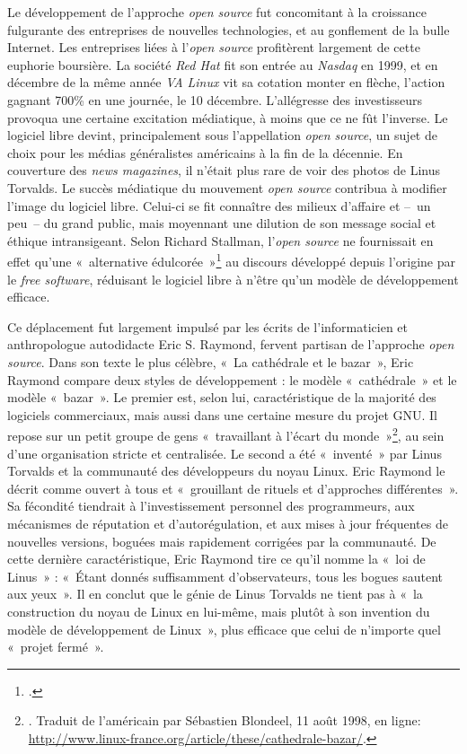 \documentclass{FramateX}
\begin{document}
\begin{refsection}
Le développement de l'approche \textit{open source} fut concomitant à la
croissance fulgurante des entreprises de nouvelles technologies, et au
gonflement de la bulle Internet. Les entreprises liées à l'\textit{open
source} profitèrent largement de cette euphorie boursière. La société
\textit{Red Hat} fit son entrée au \textit{Nasdaq} en 1999, et en
décembre de la même année \textit{VA Linux} vit sa cotation monter en
flèche, l'action gagnant 700\% en une journée, le 10 décembre.
L'allégresse des investisseurs provoqua une certaine excitation
médiatique, à moins que ce ne fût l'inverse. Le logiciel libre devint,
principalement sous l'appellation \textit{open source}, un sujet de
choix pour les médias généralistes américains à la fin de la décennie.
En couverture des \textit{news magazines}, il n'était plus rare de voir
des photos de Linus Torvalds. Le succès médiatique du mouvement
\textit{open source} contribua à modifier l'image du logiciel libre.
Celui-ci se fit connaître des milieux d'affaire et –~un peu~– du grand
public, mais moyennant une dilution de son message social et éthique
intransigeant. Selon Richard Stallman, l'\textit{open source} ne
fournissait en effet qu'une «~alternative
édulcorée~»\footnote{\cite{stallmanthus2000}.} au
discours développé depuis l'origine par le \textit{free software}, réduisant le logiciel libre à n'être
qu'un modèle de développement efficace.

Ce déplacement fut largement impulsé par les écrits de l'informaticien
et anthropologue autodidacte Eric S. Raymond, fervent partisan de
l'approche \textit{open source}. Dans son texte le plus célèbre, «~La
cathédrale et le bazar~», Eric Raymond compare deux styles de
développement : le modèle «~cathédrale~» et le modèle «~bazar~». Le
premier est, selon lui, caractéristique de la majorité des logiciels
commerciaux, mais aussi dans une certaine mesure du projet GNU. Il
repose sur un petit groupe de gens «~travaillant à l'écart du
monde~»\footnote{\cite{raymondcathedral2001}. Traduit de l'américain par Sébastien Blondeel, 11 août 1998, en ligne: \url{http://www.linux-france.org/article/these/cathedrale-bazar/}.},
au sein d'une organisation stricte et centralisée. Le second a été
«~inventé~» par Linus Torvalds et la communauté des développeurs du
noyau Linux. Eric Raymond le décrit comme ouvert à tous et «~grouillant
de rituels et d'approches différentes~». Sa fécondité tiendrait à
l'investissement personnel des programmeurs, aux
mécanismes de réputation et d'autorégulation, et aux mises à jour
fréquentes de nouvelles versions, boguées mais rapidement corrigées par
la communauté. De cette dernière caractéristique, Eric Raymond tire ce
qu'il nomme la «~loi de Linus~» : «~Étant donnés
suffisamment d'observateurs, tous les bogues sautent aux yeux~». Il en
conclut que le génie de Linus Torvalds ne tient pas à «~la construction
du noyau de Linux en lui-même, mais plutôt à son invention du modèle de
développement de Linux~», plus efficace que celui de
n'importe quel «~projet fermé~». 


\end{refsection}
\end{document}
